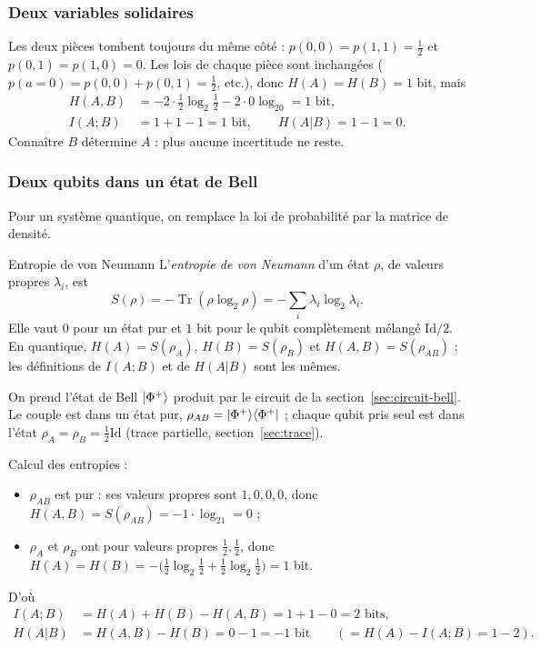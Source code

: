 \subsubsection{Deux variables solidaires}

Les deux pièces tombent toujours du même côté : $p(0,0)=p(1,1)=\frac12$ et
$p(0,1)=p(1,0)=0$. Les lois de chaque pièce sont inchangées ($p(a{=}0)=p(0,0)+p(0,1)=\frac12$,
etc.), donc $H(A)=H(B)=1$ bit, mais
\begin{align*}
  H(A,B)&=-2\cdot\tfrac12\log_2\tfrac12-2\cdot0\log_20=1\text{ bit},\\
  I(A;B)&=1+1-1=1\text{ bit},\qquad H(A|B)=1-1=0.
\end{align*}
Connaître $B$ détermine $A$ : plus aucune incertitude ne reste.

\subsubsection{Deux qubits dans un état de Bell}

Pour un système quantique, on remplace la loi de probabilité par la matrice de densité.

\begin{definition}{Entropie de von Neumann}
L'\emph{entropie de von Neumann} d'un état $\rho$, de valeurs propres $\lambda_i$, est
\[
  S(\rho)=-\operatorname{Tr}(\rho\log_2\rho)=-\sum_i\lambda_i\log_2\lambda_i .
\]
Elle vaut $0$ pour un état pur et $1$ bit pour le qubit complètement mélangé $\mathrm{Id}/2$.
En quantique, $H(A)=S(\rho_A)$, $H(B)=S(\rho_B)$ et $H(A,B)=S(\rho_{AB})$ ; les définitions de
$I(A;B)$ et de $H(A|B)$ sont les mêmes.
\end{definition}

On prend l'état de Bell $|\Phi^+\rangle$ produit par le circuit de la
section~\ref{sec:circuit-bell}. Le couple est dans un état pur,
$\rho_{AB}=|\Phi^+\rangle\langle \Phi^+|$ ; chaque qubit pris seul est dans l'état
$\rho_A=\rho_B=\frac12\mathrm{Id}$ (trace partielle, section~\ref{sec:trace}).

Calcul des entropies :
\begin{itemize}[nosep]
  \item $\rho_{AB}$ est pur : ses valeurs propres sont $1,0,0,0$, donc
        $H(A,B)=S(\rho_{AB})=-1\cdot\log_21=0$ ;
  \item $\rho_A$ et $\rho_B$ ont pour valeurs propres $\frac12,\frac12$, donc
        $H(A)=H(B)=-\big(\frac12\log_2\frac12+\frac12\log_2\frac12\big)=1$ bit.
\end{itemize}
D'où
\begin{align*}
  I(A;B)&=H(A)+H(B)-H(A,B)=1+1-0=2\text{ bits},\\
  H(A|B)&=H(A,B)-H(B)=0-1=-1\text{ bit}\qquad(=H(A)-I(A;B)=1-2).
\end{align*}

